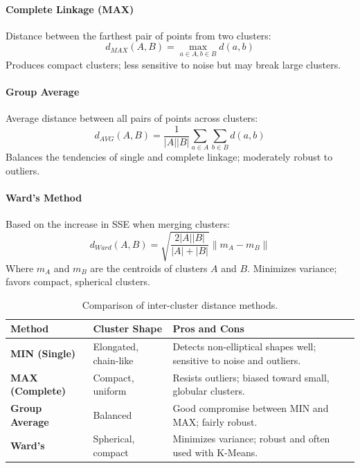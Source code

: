 \paragraph{Complete Linkage (MAX)} 
Distance between the farthest pair of points from two clusters:
\begin{equation}
d_{MAX}(A, B) = \max_{a \in A, b \in B} d(a, b)
\end{equation}
Produces compact clusters; less sensitive to noise but may break large clusters.

\paragraph{Group Average}
Average distance between all pairs of points across clusters:
\begin{equation}
d_{AVG}(A, B) = \frac{1}{|A||B|} \sum_{a \in A} \sum_{b \in B} d(a, b)
\end{equation}
Balances the tendencies of single and complete linkage; moderately robust to outliers.

\paragraph{Ward's Method}
Based on the increase in SSE when merging clusters:
\begin{equation}
d_{Ward}(A, B) = \sqrt{\frac{2|A||B|}{|A|+|B|}} \|m_A - m_B\|
\end{equation}
Where $m_A$ and $m_B$ are the centroids of clusters $A$ and $B$. Minimizes variance; favors compact, spherical clusters.

\begin{table}[h!]
\centering
\begin{tabular}{|l|p{4cm}|p{7.5cm}|}
\hline
\textbf{Method} & \textbf{Cluster Shape} & \textbf{Pros and Cons} \\
\hline
\textbf{MIN (Single)} & Elongated, chain-like & Detects non-elliptical shapes well; sensitive to noise and outliers. \\
\hline
\textbf{MAX (Complete)} & Compact, uniform & Resists outliers; biased toward small, globular clusters. \\
\hline
\textbf{Group Average} & Balanced & Good compromise between MIN and MAX; fairly robust. \\
\hline
\textbf{Ward's} & Spherical, compact & Minimizes variance; robust and often used with K-Means. \\
\hline
\end{tabular}
\caption{Comparison of inter-cluster distance methods.}
\end{table}

